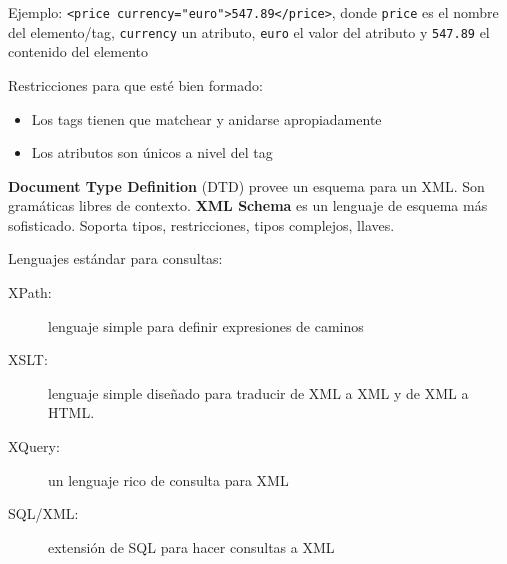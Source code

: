 Ejemplo: \texttt{<price currency="euro">547.89</price>}, donde \texttt{price} es el nombre del elemento/tag, \texttt{currency} un atributo, \texttt{euro} el valor del atributo y \texttt{547.89} el contenido del elemento

Restricciones para que esté bien formado:

\begin{itemize}
	\item Los tags tienen que matchear y anidarse apropiadamente
	\item Los atributos son únicos a nivel del tag
\end{itemize}

\textbf{Document Type Definition} (DTD) provee un esquema para un XML.
Son gramáticas libres de contexto.
\textbf{XML Schema} es un lenguaje de esquema más sofisticado.
Soporta tipos, restricciones, tipos complejos, llaves.

Lenguajes estándar para consultas:

\begin{description}
	\item[XPath:] lenguaje simple para definir expresiones de caminos
	\item[XSLT:] lenguaje simple diseñado para traducir de XML a XML y de XML a HTML.
	\item[XQuery:] un lenguaje rico de consulta para XML
	\item[SQL/XML:] extensión de SQL para hacer consultas a XML
\end{description}
